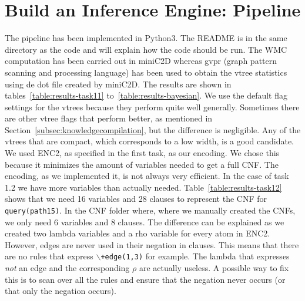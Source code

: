 \section{Build an Inference Engine: Pipeline}

The pipeline has been implemented in Python3. The README is in the same directory as the code and will explain how the code should be run. The WMC computation has been carried out in miniC2D whereas gvpr (graph pattern scanning and processing language) has been used to obtain the vtree statistics using de dot file created by miniC2D. The results are shown in tables~\ref{table:results-task11} to~\ref{table:results-bayesian}. We use the default flag settings for the vtrees because they perform quite well generally. Sometimes there are other vtree flags that perform better, as mentioned in Section~\ref{subsec:knowledgecompilation}, but the difference is negligible. Any of the vtrees that are compact, which corresponds to a low width, is a good candidate.
\\[2ex]
We used ENC2, as specified in the first task, as our encoding. We chose this because it minimizes the amount of variables needed to get a full CNF. The encoding, as we implemented it, is not always very efficient. In the case of task 1.2 we have more variables than actually needed. Table~\ref{table:results-task12} shows that we need 16 variables and 28 clauses to represent the CNF for \texttt{query(path15)}. In the CNF folder where, where we manually created the CNFs, we only need 6 variables and 8 clauses. The difference can be explained as we created two lambda variables and a rho variable for every atom in ENC2. However, edges are never used in their negation in clauses. This means that there are no rules that express \texttt{$\backslash$+edge(1,3)} for example. The lambda that expresses \textit{not} an edge and the corresponding $\rho$ are actually useless. A possible way to fix this is to scan over all the rules and ensure that the negation never occurs (or that only the negation occurs).
\\[2ex]
